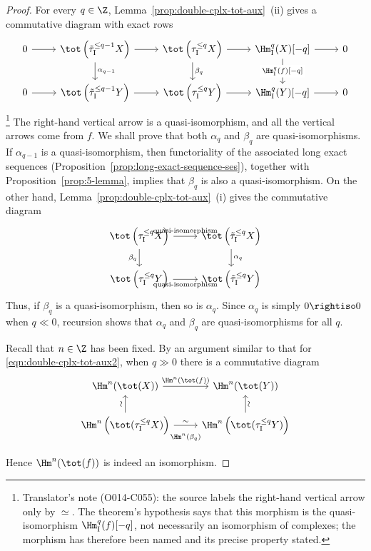 \begin{proof}
	For every $q\in\Z$, Lemma~\ref{prop:double-cplx-tot-aux}~(ii) gives a
	commutative diagram with exact rows
	\[\begin{tikzcd}
		0 \arrow[r] & \tot\left( \tilde{\tau}_{\mathrm{I}}^{\leq q-1} X \right) \arrow[r] \arrow[d, "{\alpha_{q-1}}"] & \tot\left( \tau_{\mathrm{I}}^{\leq q} X \right) \arrow[d, "{\beta_q}"] \arrow[r] & \Hm_{\mathrm{I}}^q(X)[-q] \arrow[d, "{\Hm_{\mathrm{I}}^q(f)[-q]}" description] \arrow[r] & 0 \\
		0 \arrow[r] & \tot\left( \tilde{\tau}_{\mathrm{I}}^{\leq q-1} Y \right) \arrow[r] & \tot\left( \tau_{\mathrm{I}}^{\leq q} Y \right) \arrow[r] & \Hm_{\mathrm{I}}^q(Y)[-q] \arrow[r] & 0
	\end{tikzcd}\]%
	\footnote{Translator's note (O014-C055): the source labels the right-hand
	vertical arrow only by $\simeq$. The theorem's hypothesis says that this
	morphism is the quasi-isomorphism $\Hm_{\mathrm{I}}^q(f)[-q]$, not
	necessarily an isomorphism of complexes; the morphism has therefore been
	named and its precise property stated.}
	The right-hand vertical arrow is a quasi-isomorphism, and all the vertical
	arrows come from $f$. We shall prove that both $\alpha_q$ and $\beta_q$ are
	quasi-isomorphisms. If $\alpha_{q-1}$ is a quasi-isomorphism, then
	functoriality of the associated long exact sequences
	(Proposition~\ref{prop:long-exact-sequence-ses}), together with
	Proposition~\ref{prop:5-lemma}, implies that $\beta_q$ is also a
	quasi-isomorphism. On the other hand,
	Lemma~\ref{prop:double-cplx-tot-aux}~(i) gives the commutative diagram
	\[\begin{tikzcd}
		\tot\left( \tau_{\mathrm{I}}^{\leq q} X \right) \arrow[r, "\text{quasi-isomorphism}"] \arrow[d, "{\beta_q}"'] & \tot\left( \tilde{\tau}_{\mathrm{I}}^{\leq q} X \right) \arrow[d, "{\alpha_q}"] \\
		\tot\left( \tau_{\mathrm{I}}^{\leq q} Y \right) \arrow[r, "\text{quasi-isomorphism}"'] & \tot\left( \tilde{\tau}_{\mathrm{I}}^{\leq q} Y \right)
	\end{tikzcd}\]
	Thus, if $\beta_q$ is a quasi-isomorphism, then so is $\alpha_q$. Since
	$\alpha_q$ is simply $0\rightiso0$ when $q\ll0$, recursion shows that
	$\alpha_q$ and $\beta_q$ are quasi-isomorphisms for all $q$.

	Recall that $n\in\Z$ has been fixed. By an argument similar to that for
	\eqref{eqn:double-cplx-tot-aux2}, when $q\gg0$ there is a commutative
	diagram
	\[\begin{tikzcd}
		\Hm^n(\tot(X)) \arrow[r, "{\Hm^n(\tot(f))}"] & \Hm^n(\tot(Y)) \\
		\Hm^n\left( \tot(\tau_{\mathrm{I}}^{\leq q} X) \right) \arrow[r, "{\Hm^n(\beta_q)}"' inner sep=0.8em, "\sim"] \arrow[u, "\sim" sloped] & \Hm^n\left( \tot(\tau_{\mathrm{I}}^{\leq q} Y) \right) \arrow[u, "\sim"' sloped]
	\end{tikzcd}\]
	Hence $\Hm^n(\tot(f))$ is indeed an isomorphism.


\end{proof}
